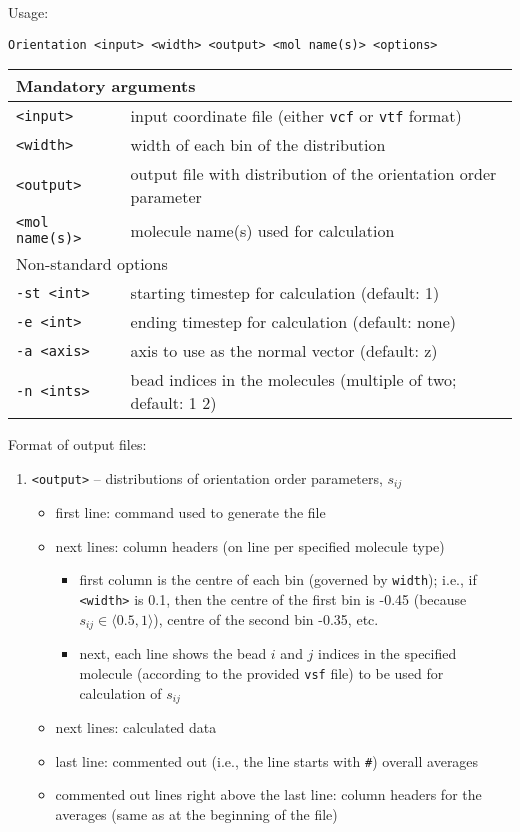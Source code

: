 Usage:

\vspace{1em}
\noindent
\texttt{Orientation <input> <width> <output> <mol name(s)> <options>}

\noindent
\begin{longtable}{p{}p{}}
  \toprule
  \multicolumn{2}{l}{Mandatory arguments} \\
  \midrule
  \texttt{<input>} & input coordinate file (either \texttt{vcf} or
    \texttt{vtf} format) \\
  \texttt{<width>} & width of each bin of the distribution \\
  \texttt{<output>} & output file with distribution of the orientation
    order parameter \\
  \texttt{<mol name(s)>} & molecule name(s) used for calculation \\
  \toprule
  \multicolumn{2}{l}{Non-standard options} \\
  \midrule
  \texttt{-st <int>} & starting timestep for calculation (default: 1) \\
  \texttt{-e <int>} & ending timestep for calculation (default: none) \\
  \texttt{-a <axis>} & axis to use as the normal vector (default: z) \\
  \texttt{-n <ints>} & bead indices in the molecules (multiple of two;
    default: 1 2) \\
  \bottomrule
\end{longtable}

\noindent
Format of output files:
\begin{enumerate}[nosep,leftmargin=20pt]
  \item \texttt{<output>} -- distributions of orientation order parameters,
    $s_{ij}$
    \begin{itemize}[nosep,leftmargin=5pt]
      \item first line: command used to generate the file
      \item next lines: column headers (on line per specified molecule type)
        \begin{itemize}[nosep,leftmargin=10pt]
          \item first column is the centre of each bin (governed by
            \texttt{width}); i.e., if \texttt{<width>} is 0.1, then the
            centre of the first bin is -0.45 (because
            $s_{ij}\in\langle0.5,1\rangle$), centre of the second bin -0.35,
            etc.
          \item next, each line shows the bead $i$ and $j$ indices in the
            specified molecule (according to the provided \texttt{vsf}
            file) to be used for calculation of $s_{ij}$
        \end{itemize}
      \item next lines: calculated data
      \item last line: commented out (i.e., the line starts with
        \texttt{\#}) overall averages
      \item commented out lines right above the last line: column headers
        for the averages (same as at the beginning of the file)
    \end{itemize}
\end{enumerate}
